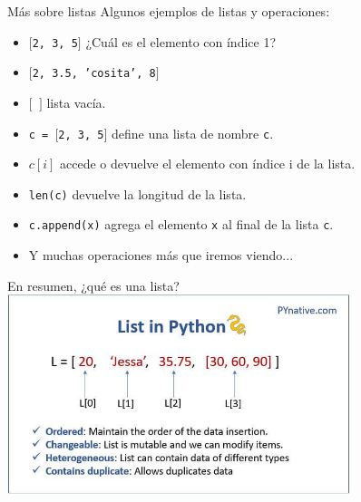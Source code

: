 \documentclass{beamer}
\begin{document}
\begin{frame}{Más sobre listas}
Algunos ejemplos de listas y operaciones:
\begin{itemize}
	\item \texttt{$[$2, 3, 5$]$} \pause 
		¿Cuál es el elemento con índice 1?\pause
	\item \texttt{$[$2, 3.5, 'cosita', 8$]$}\pause
	\item \texttt{$[$ $]$} lista vacía.\pause
	\item \texttt{c = $[$2, 3, 5$]$} define una lista de nombre \texttt{c}.
	\item \texttt{$c[i]$} accede o devuelve el elemento con índice i de la lista.\pause
	\item \texttt{len(c)} devuelve la longitud de la lista.\pause
	\item \texttt{c.append(x)} agrega el elemento \texttt{x} al final de la lista \texttt{c}.
	\item Y muchas operaciones más que iremos viendo...
\end{itemize}
\end{frame}

\begin{frame}{En resumen, ¿qué es una lista?}
\pause
\includegraphics[width=10cm]{python_list.png} 
\end{frame}
\end{document}
